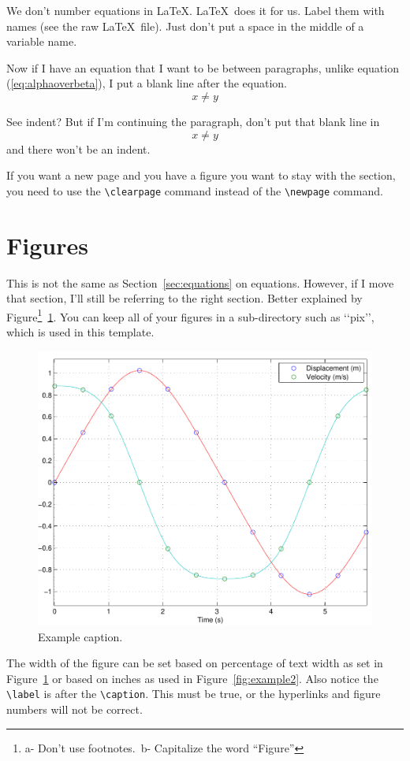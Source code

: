 \documentclass[12pt]{report}
\begin{document}
We don't number equations in \LaTeX. \LaTeX\ does it for us. Label them with names (see the raw \LaTeX\ file).   Just don't put a space in the middle of a variable name.

Now if I have an equation that I want to be between paragraphs, unlike equation (\ref{eq:alphaoverbeta}), I put a blank line after the equation.
\begin{equation}
  \label{eq:anothersillyequation}
  x\neq y
\end{equation}

See  indent? But if I'm continuing the paragraph, don't put that blank line in
\begin{equation}
  \label{eq:anothersillyequation2}
  x\neq y
\end{equation}
and there won\rq{}t be an indent.

If you want a new page and you have a figure you want to stay with the section, you need to use the \verb'\clearpage' command instead of the \verb'\newpage' command.

\section{Figures}
This is not the same as Section~\ref{sec:equations} on equations. However, if I move that section, I'll still be referring to the right section.
Better explained by Figure\footnote{a- Don't use footnotes.\ b- Capitalize the word ``Figure''}~\ref{fig:example}.  You can keep all of your figures in a sub-directory such as \lq\lq{}pix\rq\rq{}, which is used in this template.
\begin{figure}[htbp] %
   \centering
   \includegraphics[width=.5\textwidth]{pix/example} %
   \caption{Example caption.}
\label{fig:example}
\end{figure}

The width of the figure can be set based on percentage of text width as set in Figure~\ref{fig:example} or based on inches as used in Figure~\ref{fig:example2}.  Also notice the \verb'\label' is after the \verb'\caption'.  This must be true, or the hyperlinks and figure numbers will not be correct.
\end{document}
